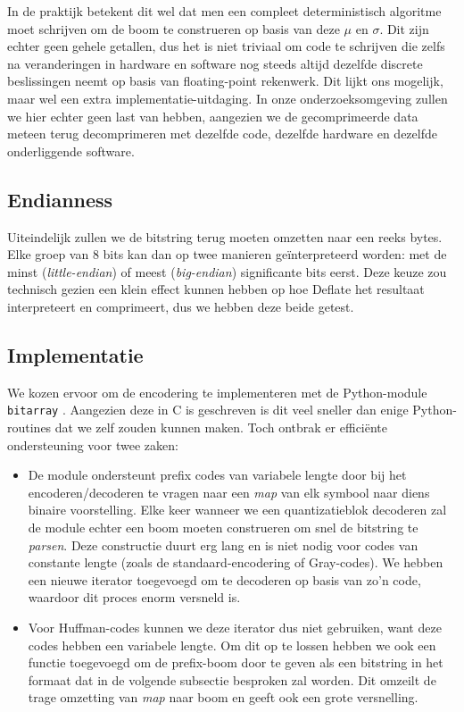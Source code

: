\begin{itemize}
In de praktijk betekent dit wel dat men een compleet deterministisch algoritme moet schrijven om de boom te construeren op basis van deze $\mu$ en $\sigma$. Dit zijn echter geen gehele getallen, dus het is niet triviaal om code te schrijven die zelfs na veranderingen in hardware en software nog steeds altijd dezelfde discrete beslissingen neemt op basis van floating-point rekenwerk. Dit lijkt ons mogelijk, maar wel een extra implementatie-uitdaging. In onze onderzoeksomgeving zullen we hier echter geen last van hebben, aangezien we de gecomprimeerde data meteen terug decomprimeren met dezelfde code, dezelfde hardware en dezelfde onderliggende software.

\end{itemize}

\subsection{Endianness}

Uiteindelijk zullen we de bitstring terug moeten omzetten naar een reeks bytes. Elke groep van 8 bits kan dan op twee manieren ge\"interpreteerd worden: met de minst (\textit{little-endian}) of meest (\textit{big-endian}) significante bits eerst. Deze keuze zou technisch gezien een klein effect kunnen hebben op hoe Deflate het resultaat interpreteert en comprimeert, dus we hebben deze beide getest.

\subsection{Implementatie}

We kozen ervoor om de encodering te implementeren met de Python-module \texttt{bitarray} \cite{ref:bitarray}. Aangezien deze in C is geschreven is dit veel sneller dan enige Python-routines dat we zelf zouden kunnen maken. Toch ontbrak er effici\"ente ondersteuning voor twee zaken:

\begin{itemize}

\item De module ondersteunt prefix codes van variabele lengte \cite{ref:variable_length_code} door bij het encoderen/decoderen te vragen naar een \textit{map} van elk symbool naar diens binaire voorstelling. Elke keer wanneer we een quantizatieblok decoderen zal de module echter een boom moeten construeren om snel de bitstring te \textit{parsen}. Deze constructie duurt erg lang en is niet nodig voor codes van constante lengte (zoals de standaard-encodering of Gray-codes). We hebben een nieuwe iterator toegevoegd om te decoderen op basis van zo'n code, waardoor dit proces enorm versneld is.

\item Voor Huffman-codes \cite{ref:huffman_coding} kunnen we deze iterator dus niet gebruiken, want deze codes hebben een variabele lengte. Om dit op te lossen hebben we ook een functie toegevoegd om de prefix-boom door te geven als een bitstring in het formaat dat in de volgende subsectie besproken zal worden. Dit omzeilt de trage omzetting van \textit{map} naar boom en geeft ook een grote versnelling.

\end{itemize}

